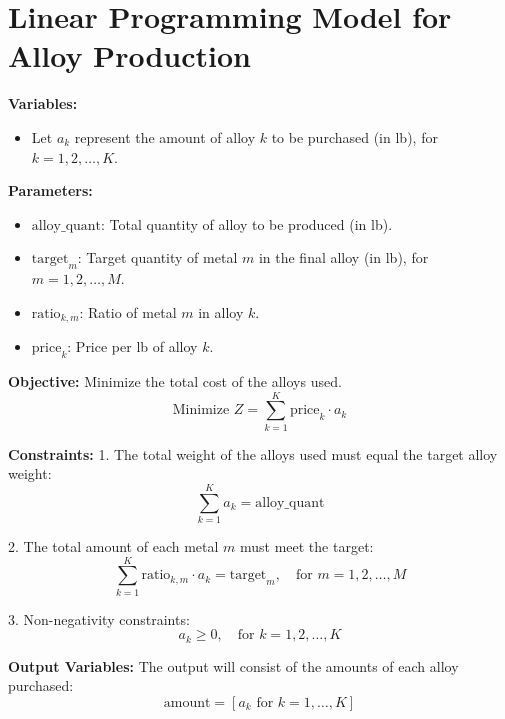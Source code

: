 \documentclass{article}
\begin{document}
\section*{Linear Programming Model for Alloy Production}

\textbf{Variables:}
\begin{itemize}
    \item Let \( a_k \) represent the amount of alloy \( k \) to be purchased (in lb), for \( k = 1, 2, \ldots, K \).
\end{itemize}

\textbf{Parameters:}
\begin{itemize}
    \item \( \text{alloy\_quant} \): Total quantity of alloy to be produced (in lb).
    \item \( \text{target}_m \): Target quantity of metal \( m \) in the final alloy (in lb), for \( m = 1, 2, \ldots, M \).
    \item \( \text{ratio}_{k,m} \): Ratio of metal \( m \) in alloy \( k \).
    \item \( \text{price}_k \): Price per lb of alloy \( k \).
\end{itemize}

\textbf{Objective:} Minimize the total cost of the alloys used.
\[
\text{Minimize } Z = \sum_{k=1}^{K} \text{price}_k \cdot a_k
\]

\textbf{Constraints:}
1. The total weight of the alloys used must equal the target alloy weight:
\[
\sum_{k=1}^{K} a_k = \text{alloy\_quant}
\]

2. The total amount of each metal \( m \) must meet the target:
\[
\sum_{k=1}^{K} \text{ratio}_{k,m} \cdot a_k = \text{target}_m, \quad \text{for } m = 1, 2, \ldots, M
\]

3. Non-negativity constraints:
\[
a_k \geq 0, \quad \text{for } k = 1, 2, \ldots, K
\]

\textbf{Output Variables:}
The output will consist of the amounts of each alloy purchased:
\[
\text{amount} = [a_k \text{ for } k = 1, \ldots, K]
\]
\end{document}
